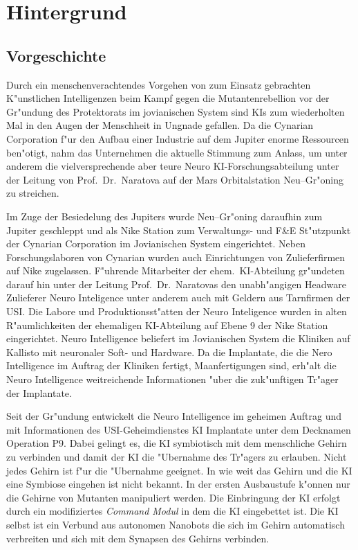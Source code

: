 \chapter{Hintergrund}

\section{Vorgeschichte}

Durch ein menschenverachtendes Vorgehen von zum Einsatz gebrachten K"unstlichen Intelligenzen beim Kampf gegen die Mutantenrebellion vor der Gr"undung des Protektorats im jovianischen System sind KIs zum wiederholten Mal in den Augen der Menschheit in Ungnade gefallen. Da die Cynarian Corporation f"ur den Aufbau einer Industrie auf dem Jupiter enorme Ressourcen ben"otigt, nahm das Unternehmen die aktuelle Stimmung zum Anlass, um unter anderem die vielversprechende aber teure Neuro KI-Forschungsabteilung unter der Leitung von Prof.~Dr.~Naratova auf der Mars Orbitalstation Neu--Gr"oning zu streichen.

Im Zuge der Besiedelung des Jupiters wurde Neu--Gr"oning daraufhin zum Jupiter geschleppt und als Nike Station zum Verwaltungs- und F\&E St"utzpunkt der Cynarian Corporation im Jovianischen System eingerichtet. Neben Forschungslaboren von Cynarian wurden auch Einrichtungen von Zulieferfirmen auf Nike zugelassen. F"uhrende Mitarbeiter der ehem.~KI-Abteilung gr"undeten darauf hin unter der Leitung Prof.~Dr.~Naratovas den unabh"angigen Headware Zulieferer Neuro Inteligence unter anderem auch mit Geldern aus Tarnfirmen der USI. Die Labore und Produktionsst"atten der Neuro Inteligence wurden in alten R"aumlichkeiten der ehemaligen KI-Abteilung auf Ebene 9 der Nike Station eingerichtet. Neuro Intelligence beliefert im Jovianischen System die Kliniken auf Kallisto mit neuronaler Soft- und Hardware. Da die Implantate, die die Nero Intelligence im Auftrag der Kliniken fertigt, Ma\3anfertigungen sind, erh"alt die Neuro Intelligence weitreichende Informationen "uber die zuk"unftigen Tr"ager der Implantate.

Seit der Gr"undung entwickelt die Neuro Intelligence im geheimen Auftrag und mit Informationen des USI-Geheimdienstes KI Implantate unter dem Decknamen Operation P9. Dabei gelingt es, die KI symbiotisch mit dem menschliche Gehirn zu verbinden und damit der KI die "Ubernahme des Tr"agers zu erlauben. Nicht jedes Gehirn ist f"ur die "Ubernahme geeignet. In wie weit das Gehirn und die KI eine Symbiose eingehen ist nicht bekannt. In der ersten Ausbaustufe k"onnen nur die Gehirne von Mutanten manipuliert werden. Die Einbringung der KI erfolgt durch ein modifiziertes \emph{Command Modul} in dem die KI eingebettet ist. Die KI selbst ist ein Verbund aus autonomen Nanobots die sich im Gehirn automatisch verbreiten und sich mit dem Synapsen des Gehirns verbinden.

